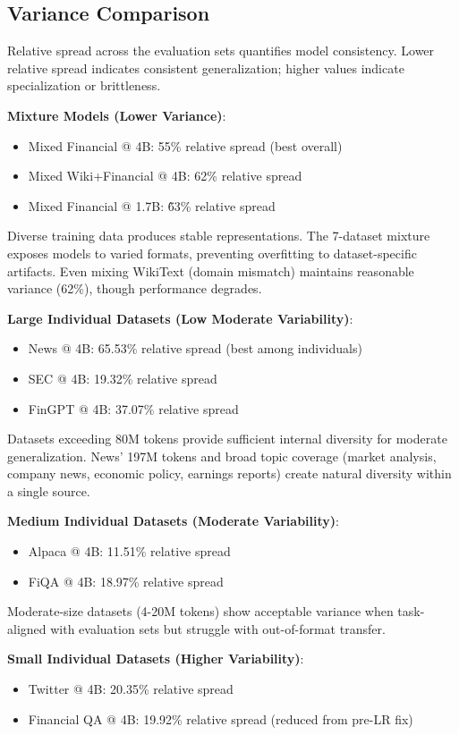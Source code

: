\subsection{Variance Comparison}

Relative spread across the evaluation sets quantifies model consistency. Lower relative spread indicates consistent generalization; higher values indicate specialization or brittleness.

\textbf{Mixture Models (Lower Variance)}:
\begin{itemize}
\item Mixed Financial @ 4B: 55\% relative spread (best overall)
\item Mixed Wiki+Financial @ 4B: 62\% relative spread
\item Mixed Financial @ 1.7B: \~63\% relative spread
\end{itemize}

Diverse training data produces stable representations. The 7-dataset mixture exposes models to varied formats, preventing overfitting to dataset-specific artifacts. Even mixing WikiText (domain mismatch) maintains reasonable variance (62\%), though performance degrades.

\textbf{Large Individual Datasets (Low Moderate Variability)}:
\begin{itemize}
\item News @ 4B: 65.53\% relative spread (best among individuals)
\item SEC @ 4B: 19.32\% relative spread
\item FinGPT @ 4B: 37.07\% relative spread
\end{itemize}

Datasets exceeding 80M tokens provide sufficient internal diversity for moderate generalization. News' 197M tokens and broad topic coverage (market analysis, company news, economic policy, earnings reports) create natural diversity within a single source.

\textbf{Medium Individual Datasets (Moderate Variability)}:
\begin{itemize}
\item Alpaca @ 4B: 11.51\% relative spread
\item FiQA @ 4B: 18.97\% relative spread
\end{itemize}

Moderate-size datasets (4-20M tokens) show acceptable variance when task-aligned with evaluation sets but struggle with out-of-format transfer.

\textbf{Small Individual Datasets (Higher Variability)}:
\begin{itemize}
\item Twitter @ 4B: 20.35\% relative spread
\item Financial QA @ 4B: 19.92\% relative spread (reduced from pre-LR fix)
\end{itemize}

